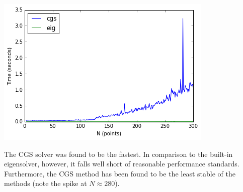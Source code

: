 \documentclass[a0b,landscape]{a0poster}
\begin{document}
\begin{multicols}{3}
\begin{center}
\endminipage\hfill
{}
\includegraphics[width=\linewidth]{analysis_10_1.png}
\endminipage
\end{center}\vspace{1cm}

The CGS solver was found to be the fastest. In comparison to the built-in eigensolver, however, it falls well short of reasonable performance standards. Furthermore, the CGS method has been found to be the least stable of the methods (note the spike at $N\approx 280$).

\columnbreak


\color{Navy} %

\begin{abstract}

Helium droplets not only provide a unique matrix environment for high resolution spec- troscopy and studying molecular solvation but also allow to use guest molecules as probes of the surrounding quantum medium.1–3 After the initial discovery of the helium droplet tech- nique for spectroscopic applications, attention quickly turned into characterizing the physical properties of the helium droplets themselves. The groundbreaking experiments by the Toen- nies group employed the glyoxal molecule as a probe to study the helium droplet response through optical absorption spectrum.
\end{abstract}


\end{multicols}
\end{document}
